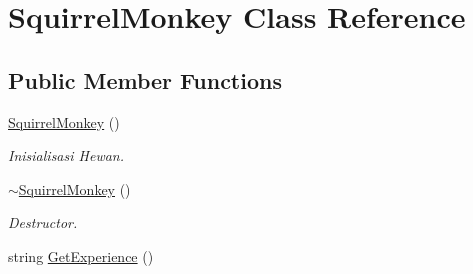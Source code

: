 \hypertarget{class_squirrel_monkey}{}\section{Squirrel\+Monkey Class Reference}
\label{class_squirrel_monkey}
\subsection*{Public Member Functions}
\begin{DoxyCompactItemize}
\item 
\hyperlink{class_squirrel_monkey_afe630290b17ed0802a1377da5f654629}{Squirrel\+Monkey} ()\hypertarget{class_squirrel_monkey_afe630290b17ed0802a1377da5f654629}{}\label{class_squirrel_monkey_afe630290b17ed0802a1377da5f654629}

\begin{DoxyCompactList}\small\item\em Inisialisasi Hewan. \end{DoxyCompactList}\item 
\hyperlink{class_squirrel_monkey_a591d18d732931da408ed1ff8c81ff753}{$\sim$\+Squirrel\+Monkey} ()\hypertarget{class_squirrel_monkey_a591d18d732931da408ed1ff8c81ff753}{}\label{class_squirrel_monkey_a591d18d732931da408ed1ff8c81ff753}

\begin{DoxyCompactList}\small\item\em Destructor. \end{DoxyCompactList}\item 
string \hyperlink{class_squirrel_monkey_a4336dd1d873b63589b421488ba6717ca}{Get\+Experience} ()\hypertarget{class_squirrel_monkey_a4336dd1d873b63589b421488ba6717ca}{}\label{class_squirrel_monkey_a4336dd1d873b63589b421488ba6717ca}


\end{DoxyCompactItemize}
